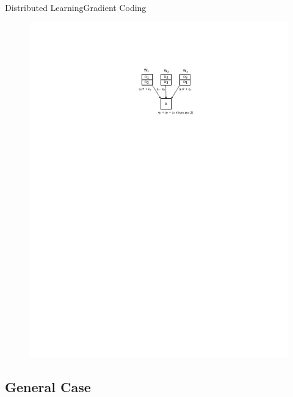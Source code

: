 \documentclass{beamer}
\begin{document}
\begin{frame}{Distributed Learning}{Gradient Coding}

\begin{figure}
    \centering
    \includegraphics[height=.7\textheight]{res/gradient coding.pdf}
\end{figure}

\end{frame}

\subsection{General Case}
\end{document}
